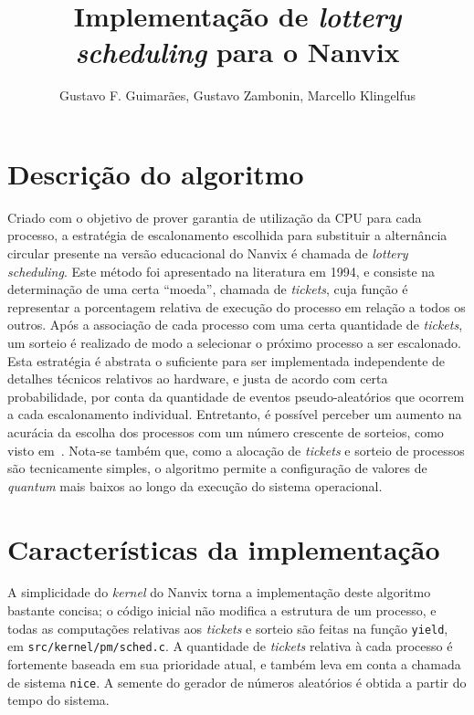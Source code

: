 \documentclass[12pt]{sftex/sftex}
\title{Implementação de \emph{lottery scheduling} para o Nanvix}
\author{Gustavo F. Guimarães, Gustavo Zambonin, Marcello Klingelfus}
\begin{document}
\maketitle

\section{Descrição do algoritmo}

Criado com o objetivo de prover garantia de utilização da CPU para cada
processo, a estratégia de escalonamento escolhida para substituir a alternância
circular presente na versão educacional do Nanvix é chamada de \emph{lottery
scheduling}. Este método foi apresentado na literatura em 1994, e consiste na
determinação de uma certa ``moeda'', chamada de \emph{tickets}, cuja função é
representar a porcentagem relativa de execução do processo em relação a todos
os outros. Após a associação de cada processo com uma certa quantidade de
\emph{tickets}, um sorteio é realizado de modo a selecionar o próximo processo
a ser escalonado. \\

Esta estratégia é abstrata o suficiente para ser implementada independente de
detalhes técnicos relativos ao hardware, e justa de acordo com certa
probabilidade, por conta da quantidade de eventos pseudo-aleatórios que ocorrem
a cada escalonamento individual. Entretanto, é possível perceber um aumento
na acurácia da escolha dos processos com um número crescente de sorteios,
como visto em~\cite[seção 2.2]{Waldspurger:1994:LSF:1267638.1267639}. Nota-se
também que, como a alocação de \emph{tickets} e sorteio de processos são
tecnicamente simples, o algoritmo permite a configuração de valores de
\emph{quantum} mais baixos ao longo da execução do sistema operacional.

\section{Características da implementação}

A simplicidade do \emph{kernel} do Nanvix torna a implementação deste algoritmo
bastante concisa; o código inicial não modifica a estrutura de um processo, e
todas as computações relativas aos \emph{tickets} e sorteio são feitas na
função \texttt{yield}, em \texttt{src/kernel/pm/sched.c}. A quantidade de
\emph{tickets} relativa à cada processo é fortemente baseada em sua prioridade
atual, e também leva em conta a chamada de sistema \texttt{nice}. A semente
do gerador de números aleatórios é obtida a partir do tempo do sistema. \\
\end{document}
